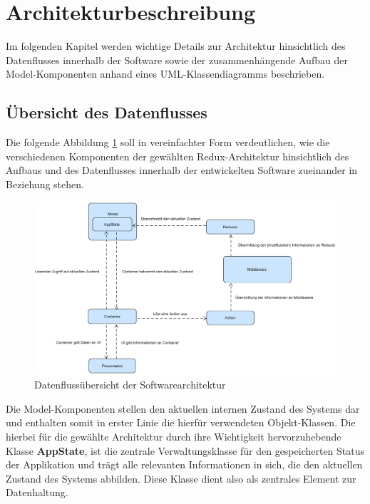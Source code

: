 \documentclass[bibliography=totoc,listof=totoc,BCOR=5mm,DIV=12,oneside]{scrbook}
\begin{document}
\newpage
\section{Architekturbeschreibung}
Im folgenden Kapitel werden wichtige Details zur Architektur hinsichtlich des Datenflusses innerhalb der Software sowie der zusammenhängende Aufbau der Model-Komponenten anhand eines UML-Klassendiagramms beschrieben.

\subsection{Übersicht des Datenflusses}
\par Die folgende Abbildung \ref{img:datastreamOverview} soll in vereinfachter Form verdeutlichen, wie die verschiedenen Komponenten der gewählten Redux-Architektur hinsichtlich des Aufbaus und des Datenflusses innerhalb der entwickelten Software zueinander in Beziehung stehen. 

\bigskip
\begin{figure}[H]
	\centering
	\includegraphics[width=1\textwidth,keepaspectratio]{Bilder/ArchitectureOverview.png}
	\caption{Datenflussübersicht der Softwarearchitektur}
	\label{img:datastreamOverview}
\end{figure}

\par \bigskip Die Model-Komponenten stellen den aktuellen internen Zustand des Systems dar und enthalten somit in erster Linie die hierfür verwendeten Objekt-Klassen. Die hierbei für die gewählte Architektur durch ihre Wichtigkeit hervorzuhebende Klasse \textbf{AppState}, ist die zentrale Verwaltungsklasse für den gespeicherten Status der Applikation und trägt alle relevanten Informationen in sich, die den aktuellen Zustand des Systems abbilden. Diese Klasse dient also als zentrales Element zur Datenhaltung.
\end{document}
